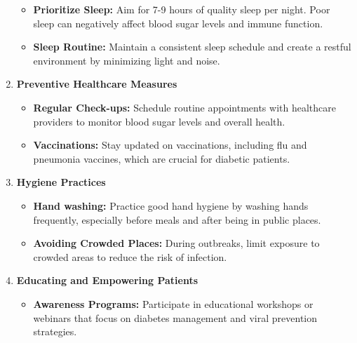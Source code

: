 \documentclass[12pt,a4paper]{article}
\begin{document}
\begin{enumerate}
\begin{itemize}
        \item \textbf{Prioritize Sleep: }Aim for 7-9 hours of quality sleep per night. Poor sleep can negatively affect blood sugar levels and immune function.

        \item \textbf{Sleep Routine:  }Maintain a consistent sleep schedule and create a restful environment by minimizing light and noise.
     
        \end{itemize}

        \item \textbf{Preventive Healthcare Measures}

        \begin{itemize}

        \item \textbf{Regular Check-ups:} Schedule routine appointments with healthcare providers to monitor blood sugar levels and overall health.

        \item \textbf{Vaccinations:  }Stay updated on vaccinations, including flu and pneumonia vaccines, which are crucial for diabetic patients.
     
        \end{itemize}

        \item \textbf{Hygiene Practices}

        \begin{itemize}

        \item \textbf{Hand washing: } Practice good hand hygiene by washing hands frequently, especially before meals and after being in public places.

        \item \textbf{Avoiding Crowded Places: } During outbreaks, limit exposure to crowded areas to reduce the risk of infection.
     
        \end{itemize}

        \item \textbf{Educating and Empowering Patients}

        \begin{itemize}

        \item \textbf{Awareness Programs: } Participate in educational workshops or webinars that focus on diabetes management and viral prevention strategies.


\end{itemize}
\end{enumerate}
\end{document}
